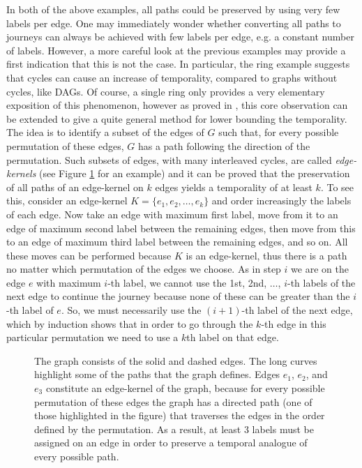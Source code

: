 \documentclass[oribibl, 11pt]{llncs}
\begin{document}
In both of the above examples, all paths could be preserved by using very few labels per edge. One may immediately wonder whether converting all paths to journeys can always be achieved with few labels per edge, e.g. a constant number of labels. However, a more careful look at the previous examples may provide a first indication that this is not the case. In particular, the ring example suggests that cycles can cause an increase of temporality, compared to graphs without cycles, like DAGs. Of course, a single ring only provides a very elementary exposition of this phenomenon, however as proved in \cite{MMCS13}, this core observation can be extended to give a quite general method for lower bounding the temporality. The idea is to identify a subset of the edges of $G$ such that, for every possible permutation of these edges, $G$ has a path following the direction of the permutation. Such subsets of edges, with many interleaved cycles, are called \emph{edge-kernels} (see Figure \ref{fig:edge-kernel} for an example) and it can be proved that the preservation of all paths of an edge-kernel on $k$ edges yields a temporality of at least $k$. To see this, consider an edge-kernel $K=\{e_1,e_2,\ldots,e_k\}$ and order increasingly the labels of each edge. Now take an edge with maximum first label, move from it to an edge of maximum second label between the remaining edges, then move from this to an edge of maximum third label between the remaining edges, and so on. All these moves can be performed because $K$ is an edge-kernel, thus there is a path no matter which permutation of the edges we choose. As in step $i$ we are on the edge $e$ with maximum $i$-th label, we cannot use the 1st, 2nd, $\ldots$, $i$-th labels of the next edge to continue the journey because none of these can be greater than the $i$-th label of $e$. So, we must necessarily use the $(i+1)$-th label of the next edge, which by induction shows that in order to go through the $k$-th edge in this particular permutation we need to use a $k$th label on that edge.

\begin{figure}[!hbtp]
\caption{The graph consists of the solid and dashed edges. The long curves highlight some of the paths that the graph defines. Edges $e_1$, $e_2$, and $e_3$ constitute an edge-kernel of the graph, because for every possible permutation of these edges the graph has a directed path (one of those highlighted in the figure) that traverses the edges in the order defined by the permutation. As a result, at least 3 labels must be assigned on an edge in order to preserve a temporal analogue of every possible path.} \label{fig:edge-kernel}
\end{figure}
\end{document}
